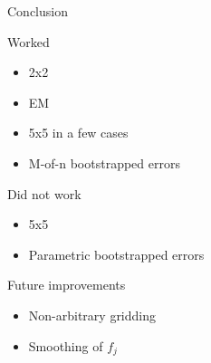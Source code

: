 \documentclass{beamer}
\begin{document}
\begin{frame}{Conclusion}
	
	Worked
	\begin{itemize}
		\item 2x2
		\item EM
		\item 5x5 in a few cases
		\item M-of-n bootstrapped errors
	\end{itemize}	
	
	Did not work
	\begin{itemize}
		\item 5x5
		\item Parametric bootstrapped errors
	\end{itemize}	
	
	
	Future improvements
	\begin{itemize}
		\item Non-arbitrary gridding
		\item Smoothing of $f_j$
	\end{itemize}	
	
\end{frame}
\end{document}
